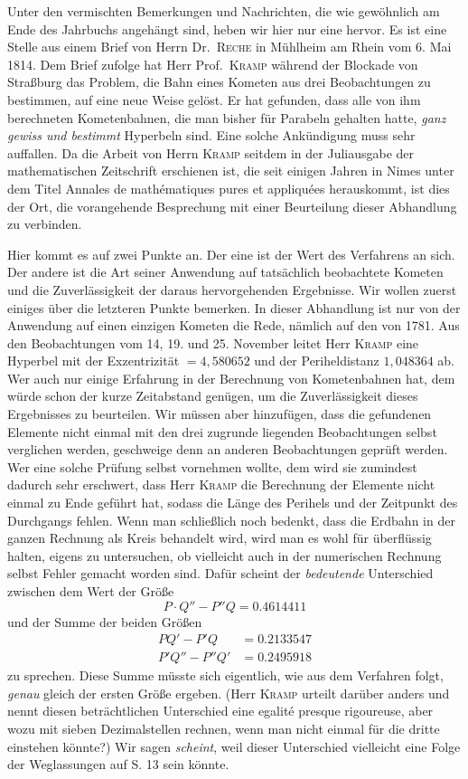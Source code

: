 Unter den vermischten Bemerkungen und Nachrichten, die wie gewöhnlich am Ende des Jahrbuchs angehängt sind, heben wir hier nur eine hervor. Es ist eine Stelle aus einem Brief von Herrn Dr.\ \textsc{Reche} in Mühlheim am Rhein vom 6. Mai 1814. Dem Brief zufolge hat Herr Prof.\ \textsc{Kramp} während der Blockade von Straßburg das Problem, die Bahn eines Kometen aus drei Beobachtungen zu bestimmen, auf eine neue Weise gelöst. Er hat gefunden, dass alle von ihm berechneten Kometenbahnen, die man bisher für Parabeln gehalten hatte, \emph{ganz gewiss und bestimmt} Hyperbeln sind. Eine solche Ankündigung muss sehr auffallen. Da die Arbeit von Herrn \textsc{Kramp} seitdem in der Juliausgabe der mathematischen Zeitschrift erschienen ist, die seit einigen Jahren in Nimes unter dem Titel Annales de mathématiques pures et appliquées herauskommt, ist dies der Ort, die vorangehende Besprechung mit einer Beurteilung dieser Abhandlung zu verbinden.

Hier kommt es auf zwei Punkte an. Der eine ist der Wert des Verfahrens an sich. Der andere ist die Art seiner Anwendung auf tatsächlich beobachtete Kometen und die Zuverlässigkeit der daraus hervorgehenden Ergebnisse. Wir wollen zuerst einiges über die letzteren Punkte bemerken. In dieser Abhandlung ist nur von der Anwendung auf einen einzigen Kometen die Rede, nämlich auf den von 1781. Aus den Beobachtungen vom 14, 19. und 25. November leitet Herr \textsc{Kramp} eine Hyperbel mit der Exzentrizität $= 4,580652$ und der Periheldistanz $1,048364$ ab. Wer auch nur einige Erfahrung in der Berechnung von Kometenbahnen hat, dem würde schon der kurze Zeitabstand genügen, um die Zuverlässigkeit dieses Ergebnisses zu beurteilen. Wir müssen aber hinzufügen, dass die gefundenen Elemente nicht einmal mit den drei zugrunde liegenden Beobachtungen selbst verglichen werden, geschweige denn an anderen Beobachtungen geprüft werden. Wer eine solche Prüfung selbst vornehmen wollte, dem wird sie zumindest dadurch sehr erschwert, dass Herr \textsc{Kramp} die Berechnung der Elemente nicht einmal zu Ende geführt hat, sodass die Länge des Perihels und der Zeitpunkt des Durchgangs fehlen. Wenn man schließlich noch bedenkt, dass die Erdbahn in der ganzen Rechnung als Kreis behandelt wird, wird man es wohl für überflüssig halten, eigens zu untersuchen, ob vielleicht auch in der numerischen Rechnung selbst Fehler gemacht worden sind. Dafür scheint der \emph{bedeutende} Unterschied zwischen dem Wert der Größe
\[
P\!\cdot\!Q'' - P''Q = 0.4614411
\]
und der Summe der beiden Größen
\[
\begin{aligned}
PQ' - P'Q &= 0.2133547\\
P'Q'' - P''Q' &= 0.2495918
\end{aligned}
\]
zu sprechen. Diese Summe müsste sich eigentlich, wie aus dem Verfahren folgt, \emph{genau} gleich der ersten Größe ergeben. (Herr \textsc{Kramp} urteilt darüber anders und nennt diesen beträchtlichen Unterschied eine egalité presque rigoureuse, aber wozu mit sieben Dezimalstellen rechnen, wenn man nicht einmal für die dritte einstehen könnte?) Wir sagen \emph{scheint}, weil dieser Unterschied vielleicht eine Folge der Weglassungen auf S. 13 sein könnte.

